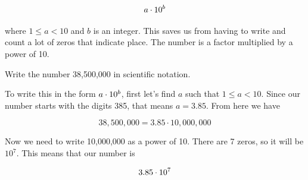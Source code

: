 \documentclass[12pt]{book}
\begin{document}
\begin{equation}
a \cdot 10^{b}
\end{equation}

where $1 \leq a < 10$ and $b$ is an integer. This saves us from having to write and count a lot of zeros that indicate place. The number is a factor multiplied by a power of 10.

\begin{exampleblock}

Write the number 38,500,000 in scientific notation.

\hspace{10pt}

To write this in the form $a \cdot 10^{b}$, first let's find $a$ such that $1 \leq a < 10$. Since our number starts with the digits 385, that means $a = 3.85$. From here we have

\begin{equation}
38,500,000 = 3.85 \cdot 10,000,000
\end{equation}

Now we need to write 10,000,000 as a power of 10. There are 7 zeros, so it will be $10^7$. This means that our number is 

\begin{equation}
3.85 \cdot 10^{7}
\end{equation}

\end{exampleblock}
\end{document}
